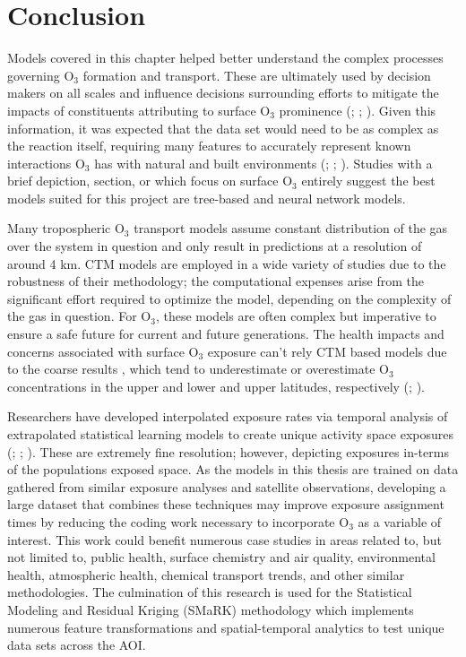 \section{Conclusion} \label{litreview:litconc} Models covered in this chapter helped better understand the complex processes governing O$_3$ formation and transport. These are ultimately used by decision makers on all scales and influence decisions surrounding efforts to mitigate the impacts of constituents attributing to surface O$_3$ prominence (\cite{du_policy_2024}; \cite{balamurugan_tropospheric_2021}; \cite{wang_policy-driven_2021}). Given this information, it was expected that the data set would need to be as complex as the reaction itself, requiring many features to accurately represent known interactions O$_3$ has with natural and built environments (\cite{gao_large-scale_2023}; \cite{sanchez_evaluation_2008}; \cite{wang_urbanization_2024}). Studies with a brief depiction, section, or which focus on surface O$_3$ entirely suggest the best models suited for this project are tree-based and neural network models.  

Many tropospheric O$_3$ transport models assume constant distribution of the gas over the system in question and only result in predictions at a resolution of around 4 km. CTM models are employed in a wide variety of studies due to the robustness of their methodology; the computational expenses arise from the significant effort required to optimize the model, depending on the complexity of the gas in question. For O$_3$, these models are often complex but imperative to ensure a safe future for current and future generations. The health impacts and concerns associated with surface O$_3$ exposure can’t rely CTM based models due to the coarse results , which tend to underestimate or overestimate O$_3$ concentrations in the upper and lower and upper latitudes, respectively (\cite{solomou_evaluating_2018}; \cite{yu_errors_2018}).

Researchers have developed interpolated exposure rates via temporal analysis of extrapolated statistical learning models to create unique activity space exposures (\cite{malley_updated_2017}; \cite{turner_long-term_2016}; \cite{crouse_ambient_2015}). These are extremely fine resolution; however, depicting exposures in-terms of the populations exposed space. As the models in this thesis are trained on data gathered from similar exposure analyses and satellite observations, developing a large dataset that combines these techniques may improve exposure assignment times by reducing the coding work necessary to incorporate O$_3$ as a variable of interest. This work could benefit numerous case studies in areas related to, but not limited to, public health, surface chemistry and air quality, environmental health, atmospheric health, chemical transport trends, and other similar methodologies. The culmination of this research is used for the Statistical Modeling and Residual Kriging (SMaRK) methodology which implements numerous feature transformations and spatial-temporal analytics to test unique data sets across the AOI.